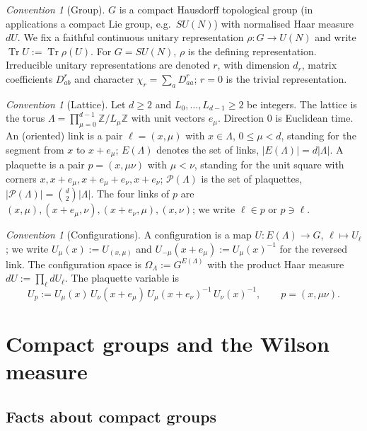 \documentclass[11pt,a4paper]{article}
\theoremstyle{definition}
\theoremstyle{remark}
\newtheorem{convention}[theorem]{Convention}
\DeclareMathOperator{\Tr}{Tr}
\newcommand{\Z}{\mathbb{Z}}
\newcommand{\cP}{\mathcal{P}}
\begin{document}
\begin{convention}[Group]
$G$ is a compact Hausdorff topological group (in applications a compact Lie group, e.g.\ $SU(N)$) with
normalised Haar measure $dU$. We fix a faithful continuous unitary representation $\rho:G\to U(N)$ and
write $\Tr U:=\Tr\rho(U)$. For $G=SU(N)$, $\rho$ is the defining representation. Irreducible unitary
representations are denoted $r$, with dimension $d_r$, matrix coefficients $D^r_{ab}$ and character
$\chi_r=\sum_a D^r_{aa}$; $r=0$ is the trivial representation.
\end{convention}

\begin{convention}[Lattice]
Let $d\ge2$ and $L_0,\dots,L_{d-1}\ge 2$ be integers. The lattice is the torus
$\Lambda=\prod_{\mu=0}^{d-1}\Z/L_\mu\Z$ with unit vectors $e_\mu$. Direction $0$ is Euclidean time.
An (oriented) link is a pair $\ell=(x,\mu)$ with $x\in\Lambda$, $0\le\mu<d$, standing for the segment from
$x$ to $x+e_\mu$; $E(\Lambda)$ denotes the set of links, $|E(\Lambda)|=d|\Lambda|$. A plaquette is a pair
$p=(x,\mu\nu)$ with $\mu<\nu$, standing for the unit square with corners $x,x+e_\mu,x+e_\mu+e_\nu,x+e_\nu$;
$\cP(\Lambda)$ is the set of plaquettes, $|\cP(\Lambda)|=\binom d2|\Lambda|$. The four links of $p$ are
$(x,\mu),(x+e_\mu,\nu),(x+e_\nu,\mu),(x,\nu)$; we write $\ell\in p$ or $p\ni\ell$.
\end{convention}

\begin{convention}[Configurations]
A configuration is a map $U:E(\Lambda)\to G$, $\ell\mapsto U_\ell$; we write $U_\mu(x):=U_{(x,\mu)}$ and
$U_{-\mu}(x+e_\mu):=U_\mu(x)^{-1}$ for the reversed link. The configuration space is
$\Omega_\Lambda:=G^{E(\Lambda)}$ with the product Haar measure $dU:=\prod_\ell dU_\ell$. The plaquette variable is
\begin{equation}\label{eq:plaquette}
U_p:=U_\mu(x)\,U_\nu(x+e_\mu)\,U_\mu(x+e_\nu)^{-1}\,U_\nu(x)^{-1},\qquad p=(x,\mu\nu).
\end{equation}
\end{convention}

\section{Compact groups and the Wilson measure}\label{sec:measure}

\subsection{Facts about compact groups}
\end{document}
